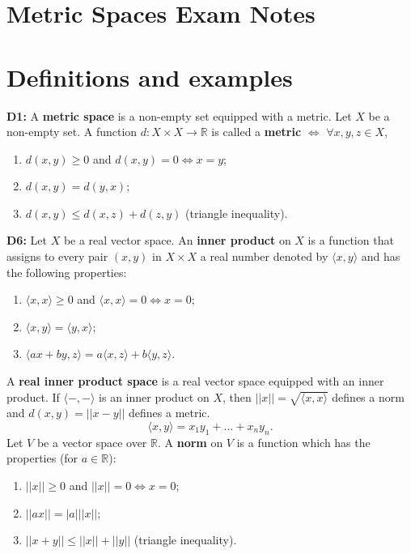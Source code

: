 \documentclass[twocolumn,10pt]{article}
\begin{document}
\section*{Metric Spaces Exam Notes}

\section{Definitions and examples}

\textbf{D1:} A \textbf{metric space} is a non-empty set equipped with a metric. Let $X$ be a non-empty set. A function $d:X\times X\to\mathbb{R}$ is called a \textbf{metric} $\Leftrightarrow$ $\forall x,y,z\in X$,
\begin{enumerate}
    \item $d(x,y)\geq0$ and $d(x,y)=0\Leftrightarrow x=y$;
    \item $d(x,y)=d(y,x)$;
    \item $d(x,y)\leq d(x,z)+d(z,y)$ (triangle inequality).
\end{enumerate}
\textbf{D6:} Let $X$ be a real vector space. An \textbf{inner product} on $X$ is a function that assigns to every pair $(x,y)$ in $X\times X$ a real number denoted by $\langle x,y\rangle$ and has the following properties:
\begin{enumerate}
    \item $\langle x,x\rangle\geq0$ and $\langle x,x\rangle=0\Leftrightarrow x=0$;
    \item $\langle x,y\rangle=\langle y,x\rangle$;
    \item $\langle ax+by,z\rangle=a\langle x,z\rangle + b\langle y,z\rangle$.
\end{enumerate}
A \textbf{real inner product space} is a real vector space equipped with an inner product. If $\langle-,-\rangle$ is an inner product on $X$, then $||x||=\sqrt{\langle x,x\rangle}$ defines a norm and $d(x,y)=||x-y||$ defines a metric.
\begin{equation*}
    \langle x,y\rangle = x_1y_1 + ... + x_ny_n.
\end{equation*}
Let $V$ be a vector space over $\mathbb{R}$. A \textbf{norm} on $V$ is a function which has the properties (for $a\in\mathbb{R}$):
\begin{enumerate}
    \item $||x||\geq0$ and $||x||=0\Leftrightarrow x=0$;
    \item $||ax|| = |a|||x||$;
    \item $||x+y||\leq ||x||+||y||$ (triangle inequality).
\end{enumerate}
\end{document}
